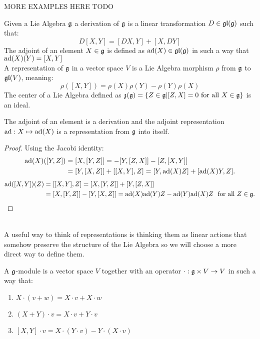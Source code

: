 \begin{ex}
	MORE EXAMPLES HERE TODO \label{MOREEXAMPLES}
\end{ex}
\begin{defi}
	Given a Lie Algebra $\mathfrak{g}$ a derivation of $\mathfrak{g}$ is a linear transformation $D\in\mathfrak{gl}(\mathfrak{g})$ such that:
	$$D[X,Y]= [DX,Y]+[X,DY]$$
	The adjoint of an element $X \in \mathfrak{g}$ is defined as $\text{ad}(X) \in \mathfrak{gl}(\mathfrak{g})$ in such a way that $\text{ad}(X)(Y) = [X,Y]$\\
	A representation of $\mathfrak{g}$ in a vector space $V$ is a Lie Algebra morphism $\rho$ from $\mathfrak{g}$ to $\mathfrak{gl}(V)$, meaning:
	$$\rho([X,Y]) = \rho(X)\rho(Y)-\rho(Y)\rho(X)$$
	The center of a Lie Algebra defined as $\mathfrak{z}(\mathfrak{g}) = \{Z \in \mathfrak{g} | [Z,X] = 0 \text{ for all } X \in \mathfrak{g}\}$ is an ideal.
\end{defi}
\begin{prop}
	The adjoint of an element is a derivation and the adjoint representation $\text{ad}: X \mapsto \text{ad}(X)$ is a representation from $\mathfrak{g}$ into itself.
	\label{13adjointrepresentation}
\end{prop}
\begin{proof}
	Using the Jacobi identity:
	\begin{align*}
	\text{ad}(X)([Y,Z]) &= [X,[Y,Z]] = -[Y,[Z,X]]-[Z,[X,Y]]\\
	&= [Y,[X,Z]] + [[X,Y],Z] = [Y,\text{ad}(X)Z] + [\text{ad}(X)Y,Z].
	\end{align*}
	\begin{align*}
	\ad([X,Y])(Z) &= [[X,Y],Z] = [X,[Y,Z]] + [Y,[Z,X]] \\
	&= [X,[Y,Z]] - [Y,[X,Z]] = \ad(X)\ad(Y)Z - \ad(Y)\ad(X)Z \ \text{ for all } Z \in \g.
	\end{align*}
\end{proof}\\
A useful way to think of representations is thinking them as linear actions that somehow preserve the structure of the Lie Algebra so we will choose a more direct way to define them.
\begin{defi}
	A $\mathfrak{g}$-module is a vector space $V$ together with an operator $\cdot: \mathfrak{g} \times V \rightarrow V$ in such a way that:
	\begin{enumerate}[label=(\alph*)]
		\item $X \cdot (v + w) = X \cdot v + X \cdot w$
		\item $(X+Y) \cdot v = X \cdot v + Y \cdot v$
		\item $[X,Y] \cdot v = X \cdot (Y \cdot v) - Y\cdot (X \cdot v)$
	\end{enumerate}
	\label{gmod}
\end{defi}
